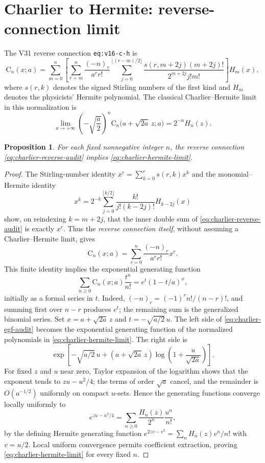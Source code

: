 \documentclass[11pt]{article}
\newtheorem{proposition}{Proposition}
\begin{document}
\section{Charlier to Hermite: reverse-connection limit}
The V31 reverse connection \texttt{eq:v16-c-h} is
\begin{equation}\label{eq:charlier-reverse-audit}
 \mathrm C_n(x;a)=\sum_{m=0}^n\left[\sum_{r=m}^n
 \frac{(-n)_r}{a^r r!}\sum_{j=0}^{\lfloor(r-m)/2\rfloor}
 \frac{s(r,m+2j)(m+2j)!}{2^{m+2j}j!m!}\right]H_m(x),
\end{equation}
where $s(r,k)$ denotes the signed Stirling numbers of the first kind and
$H_m$ denotes the physicists' Hermite polynomial.  The classical
Charlier--Hermite limit in this normalization is
\begin{equation}\label{eq:charlier-hermite-limit}
 \lim_{a\to+\infty}\left(-\sqrt{\frac a2}\right)^n
 \mathrm C_n\bigl(a+\sqrt{2a}\,z;a\bigr)=2^{-n}H_n(z).
\end{equation}
\begin{proposition}
For each fixed nonnegative integer $n$, the reverse connection
\eqref{eq:charlier-reverse-audit} implies \eqref{eq:charlier-hermite-limit}.
\end{proposition}
\begin{proof}
The Stirling-number identity $x^{\underline r}=\sum_{k=0}^r
s(r,k)x^k$ and the monomial--Hermite identity
\[
 x^k=2^{-k}\sum_{j=0}^{\lfloor k/2\rfloor}
 \frac{k!}{j!(k-2j)!}H_{k-2j}(x)
\]
show, on reindexing $k=m+2j$, that the inner double sum of
\eqref{eq:charlier-reverse-audit} is exactly $x^{\underline r}$.
Thus the \emph{reverse connection itself}, without assuming a
Charlier--Hermite limit, gives
\[
 \mathrm C_n(x;a)=\sum_{r=0}^n\frac{(-n)_r}{a^r r!}
 x^{\underline r}.
\]
This finite identity implies the exponential generating function
\begin{equation}\label{eq:charlier-egf-audit}
 \sum_{n\ge0}\mathrm C_n(x;a)\frac{t^n}{n!}
 =e^t(1-t/a)^x,
\end{equation}
initially as a formal series in $t$. Indeed,
$(-n)_r=(-1)^r n!/(n-r)!$, and summing first over $n-r$
produces $e^t$; the remaining sum is the generalized binomial series.
Set $x=a+\sqrt{2a}\,z$ and $t=-\sqrt{a/2}\,u$. The left side of
\eqref{eq:charlier-egf-audit} becomes the exponential generating
function of the normalized polynomials in \eqref{eq:charlier-hermite-limit}.
The right side is
\[
 \exp\!\left[-\sqrt{a/2}\,u+
 (a+\sqrt{2a}\,z)\log\left(1+\frac{u}{\sqrt{2a}}\right)\right].
\]
For fixed $z$ and $u$ near zero, Taylor expansion of the logarithm
shows that the exponent tends to $zu-u^2/4$; the terms of order
$\sqrt a$ cancel, and the remainder is $O(a^{-1/2})$ uniformly on
compact $u$-sets. Hence the generating functions converge locally
uniformly to
\[
 e^{zu-u^2/4}=\sum_{n\ge0}\frac{H_n(z)}{2^n}\frac{u^n}{n!},
\]
by the defining Hermite generating function
$e^{2zv-v^2}=\sum_n H_n(z)v^n/n!$ with $v=u/2$.
Local uniform convergence permits coefficient extraction, proving
\eqref{eq:charlier-hermite-limit} for every fixed $n$.
\end{proof}
\end{document}
